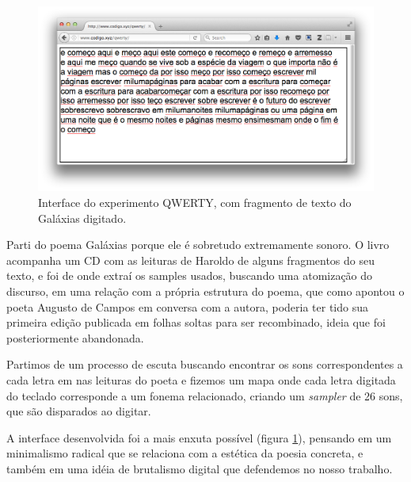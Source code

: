 \begin{figure}
    \caption{\label{qwerty}Interface do experimento QWERTY, com fragmento de texto do Galáxias digitado. }
    \begin{center}
    \includegraphics[width=1\linewidth]{pictures/cap3/qwerty.png}
    \end{center}
\end{figure}

Parti do poema Galáxias porque ele é sobretudo extremamente sonoro. O livro acompanha um CD com as leituras de Haroldo de alguns fragmentos do seu texto, e foi de onde extraí os samples usados, buscando uma atomização do discurso, em uma relação com a própria estrutura do poema, que como apontou o poeta Augusto de Campos em conversa com a autora, poderia ter tido sua primeira edição publicada em folhas soltas para ser recombinado, ideia que foi posteriormente abandonada.

Partimos de um processo de escuta buscando encontrar os sons correspondentes a cada letra em nas leituras do poeta e fizemos um mapa onde cada letra digitada do teclado corresponde a um fonema relacionado, criando um \emph{sampler} de 26 sons, que são disparados ao digitar.

A interface desenvolvida foi a mais enxuta possível (figura \ref{qwerty}), pensando em um minimalismo radical que se relaciona com a estética da poesia concreta, e também em uma idéia de brutalismo digital que defendemos no nosso trabalho.

